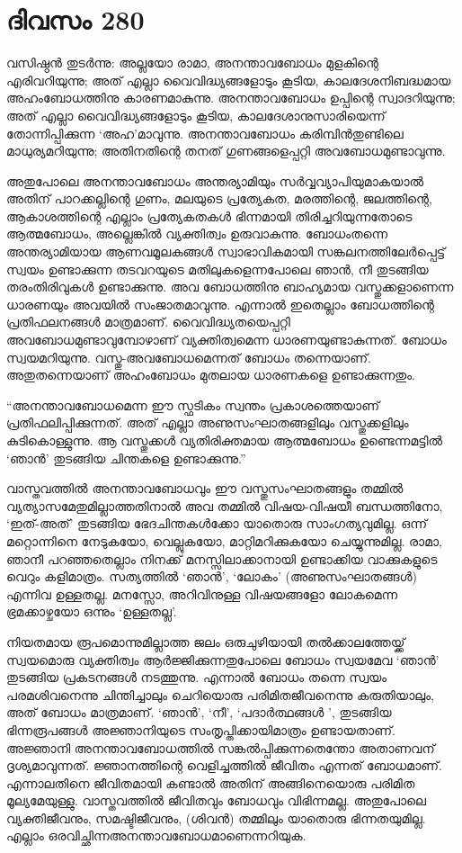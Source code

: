 \section{ദിവസം 280}


വസിഷ്ഠന്‍ തുടര്‍ന്നു: അല്ലയോ രാമാ, അനന്താവബോധം മുളകിന്റെ എരിവറിയുന്നു; അത് എല്ലാ വൈവിദ്ധ്യങ്ങളോടും കൂടിയ, കാലദേശനിബദ്ധമായ  അഹംബോധത്തിനു കാരണമാകുന്നു. അനന്താവബോധം ഉപ്പിന്റെ സ്വാദറിയുന്നു; അത് എല്ലാ വൈവിദ്ധ്യങ്ങളോടും കൂടിയ, കാലദേശാനുസാരിയെന്ന് തോന്നിപ്പിക്കുന്ന ‘അഹ’മാവുന്നു. അനന്താവബോധം കരിമ്പിന്‍തുണ്ടിലെ മാധുര്യമറിയുന്നു; അതിനതിന്റെ തനത് ഗുണങ്ങളെപ്പറ്റി അവബോധമുണ്ടാവുന്നു. 

അതുപോലെ അനന്താവബോധം അന്തര്യാമിയും സര്‍വ്വവ്യാപിയുമാകയാല്‍ അതിന് പാറക്കല്ലിന്റെ ഗുണം, മലയുടെ പ്രത്യേകത, മരത്തിന്റെ, ജലത്തിന്റെ, ആകാശത്തിന്റെ എല്ലാം പ്രത്യേകതകള്‍ ഭിന്നമായി തിരിച്ചറിയുന്നതോടെ ആത്മബോധം, അല്ലെങ്കില്‍ വ്യക്തിത്വം ഉരുവാകുന്നു. ബോധംതന്നെ അന്തര്യാമിയായ ആണവമൂലകങ്ങള്‍ സ്വാഭാവികമായി സങ്കലനത്തിലേര്‍പ്പെട്ട് സ്വയം ഉണ്ടാക്കുന്ന തടവറയുടെ  മതിലുകളെന്നപോലെ ഞാന്‍, നീ തുടങ്ങിയ തരംതിരിവുകള്‍ ഉണ്ടാക്കുന്നു. അവ ബോധത്തിനു ബാഹ്യമായ വസ്തുക്കളാണെന്ന ധാരണയും അവയില്‍ സംജാതമാവുന്നു. എന്നാല്‍ ഇതെല്ലാം ബോധത്തിന്റെ പ്രതിഫലനങ്ങള്‍ മാത്രമാണ്. വൈവിദ്ധ്യതയെപ്പറ്റി അവബോധമുണ്ടാവുമ്പോഴാണ് വ്യക്തിത്വമെന്ന ധാരണയുണ്ടാകുന്നത്. ബോധം സ്വയമറിയുന്നു. വസ്തു-അവബോധമെന്നത് ബോധം തന്നെയാണ്. അതുതന്നെയാണ് അഹംബോധം മുതലായ ധാരണകളെ ഉണ്ടാക്കുന്നതും.         

“അനന്താവബോധമെന്ന ഈ സ്ഫടികം സ്വന്തം പ്രകാശത്തെയാണ് പ്രതിഫലിപ്പിക്കുന്നത്. അത് എല്ലാ അണുസംഘാതങ്ങളിലും വസ്തുക്കളിലും കുടികൊള്ളുന്നു. ആ വസ്തുക്കള്‍ വ്യതിരിക്തമായ ആത്മബോധം ഉണ്ടെന്നമട്ടില്‍ ‘ഞാന്‍’ തുടങ്ങിയ ചിന്തകളെ ഉണ്ടാക്കുന്നു.” 

വാസ്തവത്തില്‍ അനന്താവബോധവും ഈ വസ്തുസംഘാതങ്ങളും തമ്മില്‍ വ്യത്യാസമേതുമില്ലാത്തതിനാല്‍ അവ തമ്മില്‍ വിഷയ-വിഷയീ ബന്ധത്തിനോ, ‘ഇത്-അത്‌’ തുടങ്ങിയ ഭേദചിന്തകള്‍ക്കോ യാതൊരു സാംഗത്യവുമില്ല. ഒന്ന് മറ്റൊന്നിനെ നേടുകയോ, വെല്ലുകയോ, മാറ്റിമറിക്കുകയോ ചെയ്യുന്നുമില്ല.  രാമാ, ഞാനീ പറഞ്ഞതെല്ലാം നിനക്ക് മനസ്സിലാക്കാനായി ഉണ്ടാക്കിയ വാക്കുകളുടെ വെറും കളിമാത്രം. സത്യത്തില്‍ ‘ഞാന്‍’, ‘ലോകം’ (അണുസംഘാതങ്ങള്‍)  എന്നിവ ഉള്ളതല്ല. മനസ്സോ, അറിവിനുള്ള വിഷയങ്ങളോ ലോകമെന്ന ഭ്രമക്കാഴ്ചയോ ഒന്നും ‘ഉള്ളതല്ല’.

നിയതമായ രൂപമൊന്നുമില്ലാത്ത ജലം ഒരുചുഴിയായി തല്‍ക്കാലത്തേയ്ക്ക് സ്വയമൊരു വ്യക്തിത്വം ആര്‍ജ്ജിക്കുന്നതുപോലെ ബോധം സ്വയമേവ ‘ഞാന്‍’ തുടങ്ങിയ പ്രകടനങ്ങള്‍ നടത്തുന്നു. എന്നാല്‍ ബോധം തന്നെ സ്വയം പരമശിവനെന്നു ചിന്തിച്ചാലും ചെറിയൊരു പരിമിതജീവനെന്നു കരുതിയാലും, അത് ബോധം മാത്രമാണ്. ‘ഞാന്‍’, ‘നീ’, ‘പദാര്‍ത്ഥങ്ങള്‍ ’,  തുടങ്ങിയ ഭിന്നരൂപങ്ങള്‍ അജ്ഞാനിയുടെ സംതൃപ്തിക്കായിമാത്രം ഉണ്ടായതാണ്. അജ്ഞാനി അനന്താവബോധത്തില്‍ സങ്കല്‍പ്പിക്കുന്നതെന്തോ അതാണവന് ദൃശ്യമാവുന്നത്. ജ്ഞാനത്തിന്റെ വെളിച്ചത്തില്‍ ജീവിതം എന്നത് ബോധമാണ്. എന്നാലതിനെ ജീവിതമായി കണ്ടാല്‍ അതിന് അങ്ങിനെയൊരു പരിമിത മൂല്യമേയുള്ളു. വാസ്തവത്തില്‍ ജീവിതവും ബോധവും വിഭിന്നമല്ല. അതുപോലെ വ്യക്തിജീവനും, സമഷ്ടിജീവനും, (ശിവന്‍) തമ്മിലും യാതൊരു ഭിന്നതയുമില്ല. എല്ലാം ഒരവിച്ഛിന്നഅനന്താവബോധമാണെന്നറിയുക.